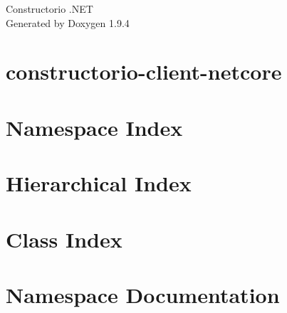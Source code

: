 \documentclass[twoside]{book}
\newcommand{\+}{\discretionary{\mbox{\scriptsize$\hookleftarrow$}}{}{}}
\newcommand{\clearemptydoublepage}{%
    \newpage{\pagestyle{empty}\cleardoublepage}%
  }
\begin{document}
  \raggedbottom
    \hypersetup{pageanchor=false,
                bookmarksnumbered=true,
                pdfencoding=unicode
               }
  \begin{titlepage}
  \vspace*{7cm}
  \begin{center}%
  {\Large Constructorio .\+NET}\\
  \vspace*{1cm}
  {\large Generated by Doxygen 1.9.4}\\
  \end{center}
  \end{titlepage}
  \clearemptydoublepage
  \tableofcontents
  \clearemptydoublepage
  \hypersetup{pageanchor=true}
\chapter{constructorio-\/client-\/netcore}
\label{index}\hypertarget{index}{}
\chapter{Namespace Index}

\chapter{Hierarchical Index}

\chapter{Class Index}

\chapter{Namespace Documentation}



\end{document}
